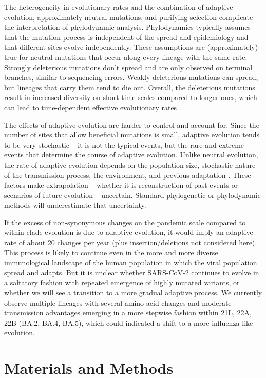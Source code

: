 \documentclass[aps,rmp, twocolumn]{revtex4}
\begin{document}
The heterogeneity in evolutionary rates and the combination of adaptive evolution, approximately neutral mutations, and purifying selection complicate the interpretation of phylodynamic analysis.
Phylodynamics typically assumes that the mutation process is independent of the spread and epidemiology and that different sites evolve independently.
These assumptions are (approximately) true for neutral mutations that occur along every lineage with the same rate.
Strongly deleterious mutations don't spread and are only observed on terminal branches, similar to sequencing errors.
Weakly deleterious mutations can spread, but lineages that carry them tend to die out.
Overall, the deleterious mutations result in increased diversity on short time scales compared to longer ones, which can lead to time-dependent effective evolutionary rates \citep{wertheim_purifying_2011}.

The effects of adaptive evolution are harder to control and account for.
Since the number of sites that allow beneficial mutations is small, adaptive evolution tends to be very stochastic -- it is not the typical events, but the rare and extreme events that determine the course of adaptive evolution.
Unlike neutral evolution, the rate of adaptive evolution depends on the population size, stochastic nature of the transmission process, the environment, and previous adaptation \citep{neher_genetic_2013}.
These factors make extrapolation -- whether it is reconstruction of past events or scenarios of future evolution -- uncertain.
Standard phylogenetic or phylodynamic methods will underestimate that uncertainty.

If the excess of non-synonymous changes on the pandemic scale compared to within clade evolution is due to adaptive evolution, it would imply an adaptive rate of about 20 changes per year (plus insertion/deletions not considered here).
This process is likely to continue even in the more and more diverse immunological landscape of the human population in which the viral population spread and adapts.
But it is unclear whether SARS-CoV-2 continues to evolve in a saltatory fashion with repeated emergence of highly mutated variants, or whether we will see a transition to a more gradual adaptive process.
We currently observe multiple lineages with several amino acid changes and moderate transmission advantages emerging in a more stepwise fashion within 21L, 22A, 22B (BA.2, BA.4, BA.5), which could indicated a shift to a more influenza-like evolution.

\section*{Materials and Methods}
\end{document}
